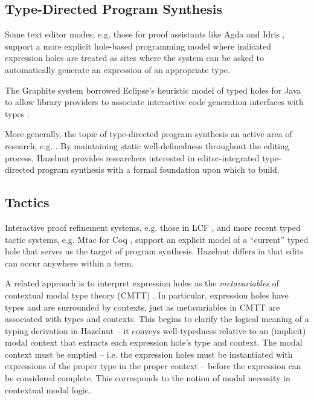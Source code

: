 \documentclass[9pt]{sigplanconf}
\begin{document}
\subsection{Type-Directed Program Synthesis}
Some text editor modes, e.g. those for proof assistants like
Agda \cite{norell:thesis} and Idris \cite{brady2013idris}, support a more
explicit hole-based programming model where indicated expression holes are
treated as sites where the system can be asked to automatically generate an
expression of an appropriate type. %

The Graphite system borrowed Eclipse's heuristic model of typed holes for Java to allow
library providers to associate interactive code generation interfaces with
types \cite{Omar:2012:ACC:2337223.2337324}.

More generally, the topic of type-directed program synthesis an active area
of research, e.g. \cite{DBLP:conf/pldi/OseraZ15}. By maintaining static
well-definedness throughout the editing process, Hazelnut provides
researchers interested in editor-integrated type-directed program synthesis
with a formal foundation upon which to build.

\subsection{Tactics}

Interactive proof refinement systems, e.g. those in LCF \cite{Gordon:1978:MIP:512760.512773}, and more recent typed tactic systems, e.g. Mtac for Coq \cite{ziliani2015mtac}, 
support an explicit model of a ``current'' typed hole that serves as the 
target of program synthesis. Hazelnut differs in that edits can occur anywhere within a term.


A related approach is to interpret expression holes as the \emph{metavariables} of contextual modal type theory
(CMTT) \cite{DBLP:journals/tocl/NanevskiPP08}. In particular, expression
holes have types and are surrounded by contexts, just as metavariables in
CMTT are associated with types and contexts. This begins to clarify the
logical meaning of a typing derivation in Hazelnut -- it conveys
well-typedness relative to an (implicit) modal context that extracts each
expression hole's type and context. The modal context must be emptied --
i.e. the expression holes must be instantiated with expressions of the
proper type in the proper context -- before the expression can be
considered complete. This corresponds to the notion of modal necessity in
contextual modal logic.
\end{document}
